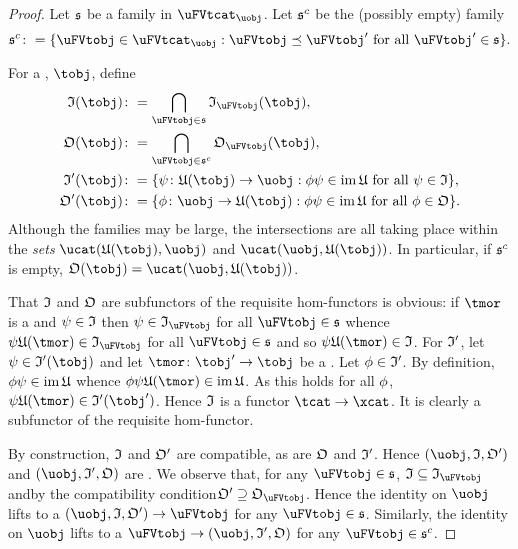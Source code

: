 \documentclass[%
a4paper,%
arxiv,%
defaults
]{myclass}
\begin{document}
\begin{proof}
Let \(\family{S}\) be a family in \(\uFVtcat_{\uobj}\).
Let \(\family{S}^c\) be the (possibly empty) family
%
\[
  \family{S}^c \coloneqq \{\uFVtobj \in \uFVtcat_{\uobj} : \uFVtobj \preceq \uFVtobj' \text{ for all } \uFVtobj' \in \family{S}\}.
\]

For a \tobj, \(\tobj\), define
%
\begin{align*}
\itest(\tobj) &\coloneqq \bigcap_{\uFVtobj \in \family{S}} \itest_{\uFVtobj}(\tobj), \\
%
\otest(\tobj) &\coloneqq \bigcap_{\uFVtobj \in \family{S}^c} \otest_{\uFVtobj}(\tobj), \\
%
\itest'(\tobj) &\coloneqq \{ \ifn \colon \ufunc(\tobj) \to \uobj : \ofn \ifn \in \im \ufunc \text{ for all } \ifn \in \itest\}, \\
%
\otest'(\tobj) &\coloneqq \{ \ofn \colon \uobj \to \ufunc(\tobj) : \ofn \ifn \in \im \ufunc \text{ for all } \ofn \in \otest\}.
\end{align*}
%
Although the families may be large, the intersections are all taking place within the \emph{sets} \(\Hom{\ucat}{\ufunc(\tobj)}{\uobj}\) and \(\Hom{\ucat}{\uobj}{\ufunc(\tobj)}\).
In particular, if \(\family{S}^c\) is empty, \(\otest(\tobj) = \Hom{\ucat}{\uobj}{\ufunc(\tobj)}\).

That \(\itest\) and \(\otest\) are subfunctors of the requisite hom\hyp{}functors is obvious: if \(\tmor\) is a \tmor and \(\ifn \in \itest\) then \(\ifn \in \itest_{\uFVtobj}\) for all \(\uFVtobj \in \family{S}\) whence \(\ifn \ufunc(\tmor) \in \itest_{\uFVtobj}\) for all \(\uFVtobj \in \family{S}\) and so \(\ifn \ufunc(\tmor) \in \itest\).
For \(\itest'\), let \(\ifn \in \itest'(\tobj)\) and let \(\tmor \colon \tobj' \to \tobj\) be a \tmor.
Let \(\ofn \in \itest'\).
By definition, \(\ofn \ifn \in \im \ufunc\) whence \(\ofn \ifn \ufunc(\tmor) \in \im \ufunc\).
As this holds for all \(\phi\), \(\ifn \ufunc(\tmor) \in \itest'(\tobj')\).
Hence \(\itest\) is a functor \(\tcat \to \xcat\).
It is clearly a subfunctor of the requisite hom\hyp{}functor.

By construction, \(\itest\) and \(\otest'\) are compatible, as are \(\otest\) and \(\itest'\).
Hence \((\uobj, \itest, \otest')\) and \((\uobj, \itest', \otest)\) are \uVtobjs.
We observe that, for any \(\uFVtobj \in \family{S}\), \(\itest \subseteq \itest_{\uFVtobj}\) and\emhyp{}by the compatibility condition\emhyp{}\(\otest' \supseteq \otest_{\uFVtobj}\).
Hence the identity on \(\uobj\) lifts to a \uVtmor \((\uobj, \itest, \otest') \to \uFVtobj\) for any \(\uFVtobj \in \family{S}\).
Similarly, the identity on \(\uobj\) lifts to a \uVtmor \(\uFVtobj \to (\uobj, \itest', \otest)\) for any \(\uFVtobj \in \family{S}^c\).



\end{proof}
\end{document}
